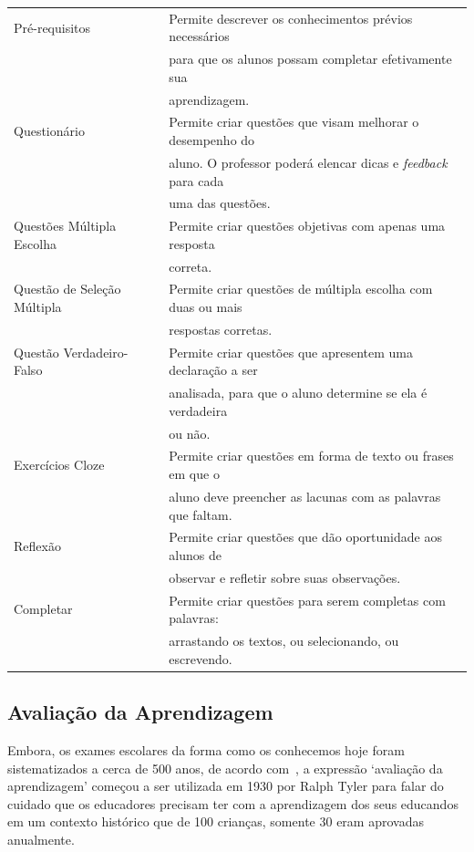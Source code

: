 \begin{table}[htbp]
\begin{tabular}{|l|l|}
		Pré-requisitos & Permite descrever os conhecimentos prévios necessários \\ &para que os alunos possam completar efetivamente sua \\ &aprendizagem. \\ \hline
		Questionário & Permite criar questões que visam melhorar o desempenho do \\ &aluno. O professor poderá elencar dicas e \textit{feedback} para cada \\ &uma das questões. \\ \hline
		Questões Múltipla Escolha & Permite criar questões objetivas com apenas uma resposta \\&correta. \\ \hline
		Questão de Seleção Múltipla & Permite criar questões de múltipla escolha com duas ou mais \\ &respostas corretas. \\ \hline
		Questão Verdadeiro-Falso & Permite criar questões que apresentem uma declaração a ser \\ &analisada, para que o aluno determine se ela é verdadeira \\&ou não. \\ \hline
		Exercícios Cloze & Permite criar questões em forma de texto ou frases em que o \\ &aluno deve preencher as lacunas com as palavras que faltam. \\ \hline
		Reflexão & Permite criar questões que dão oportunidade aos alunos de \\ &observar e refletir sobre suas observações. \\ \hline
		Completar & Permite criar questões para serem completas com palavras: \\ &arrastando os textos, ou selecionando, ou escrevendo. \\ \hline
	\end{tabular}
	\label{Tabela:Objetos de Aprendizagem}
\end{table}


\subsection{Avaliação da Aprendizagem}\label{section:avaliacao_aprendizagem}

Embora, os exames escolares da forma como os conhecemos hoje foram sistematizados a cerca de 500 anos, de acordo com~\cite{luckesi:2014}, a expressão `avaliação da aprendizagem' começou a ser utilizada em 1930 por Ralph Tyler para falar do cuidado que os educadores precisam ter com a aprendizagem dos seus educandos em um contexto histórico que de 100 crianças, somente 30 eram aprovadas anualmente.

